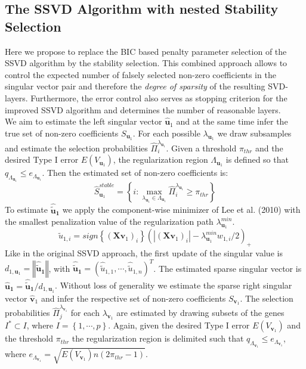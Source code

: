 \subsection{The SSVD Algorithm with nested Stability Selection}
Here we propose to replace the BIC based penalty parameter selection of the SSVD algorithm by the stability selection. 
This combined approach allows to control the expected number of falsely selected non-zero coefficients in the singular vector pair and therefore the \textit{degree of sparsity} of the resulting SVD-layers. Furthermore, the error control also serves as stopping criterion for the improved SSVD algorithm and determines the number of reasonable layers. \\
We aim to estimate the left singular vector $\mathbf{\hat{u}}_{1}$ and at the same time infer the true set of non-zero coefficients $S_{\mathbf{u}_{1}}$.
For each possible $\lambda_{\mathbf{u}_{1}}$ we draw subsamples and estimate the selection probabilities $\hat{\Pi}_{i}^{\lambda_{\mathbf{u}_{1}}}$.
Given a threshold $\pi_{thr}$ and the desired Type I error $E(V_{\mathbf{u}_{1}})$, the regularization region $\Lambda_{\mathbf{u}_{1}}$ is defined so that $q_{\Lambda_{\mathbf{u}_{1}}} \leq e_{\Lambda_{\mathbf{u}_{1}}}$.
Then the estimated set of non-zero coefficients is:\\
\begin{equation}
\hat{S}_{\mathbf{u}_{1}}^{stable}=\left\{i: \max_{\lambda_{\mathbf{u}_{1}} \in \Lambda_{\mathbf{u}_{1}}} \hat{\Pi}_{i}^{\lambda_{\mathbf{u}_{1}}} \geq \pi_{thr} \right\}
\end{equation}
To estimate $\mathbf{\hat{\tilde{u}}_{1}}$ we apply the component-wise minimizer of Lee et al. (2010) with the smallest penalization value of the regularization path $\lambda_{\mathbf{u}_{1}}^{min}$.
\begin{equation}
\hat{\tilde{u}}_{1,i}=\textit{sign} \left\{(\mathbf{X}\mathbf{v}_{1})_{i} \right\} (|(\mathbf{X}\mathbf{v}_{1})_{i}|- \lambda^{min}_{\mathbf{u}_{1}}w_{1,i}/2)_{+} 
\end{equation}
Like in the original SSVD approach, the first update of the singular value is $d_{1,\mathbf{u}_{1}}=\left\Vert\mathbf{\hat{\tilde{u}}_{1}}\right\Vert$, with 
$\mathbf{\hat{\tilde{u}}_{1}}=(\hat{\tilde{u}}_{1,1},\cdots,\hat{\tilde{u}}_{1,n})^{T}$. The estimated sparse singular vector is  $\mathbf{\hat{u}_{1}}=\mathbf{\hat{\tilde{u}}_{1}}/d_{1,\mathbf{u}_{1}}$.
Without loss of generality we estimate the sparse right singular vector $\mathbf{\hat{v}}_{1}$ and infer the respective set of non-zero coefficients $S_{\mathbf{v}_{1}}$. The selection probabilities $\hat{\Pi}_{j}^{\lambda_{\mathbf{v}_{1}}}$ for each $\lambda_{\mathbf{v}_{1}}$ are estimated by drawing subsets of the genes $I^{*} \subset I$, where $I=\left\{1,\cdots,p \right\}$. Again, given the desired Type I error $E(V_{\mathbf{v}_{1}})$ and the threshold $\pi_{thr}$ the regularization region is delimited such that $q_{\Lambda_{\mathbf{v}_{1}}} \leq e_{\Lambda_{\mathbf{v}_{1}}}$, where $e_{\Lambda_{\mathbf{v}_{1}}}= \sqrt{E(V_{\mathbf{v}_{1}})n(2\pi_{thr}-1)}$. 
